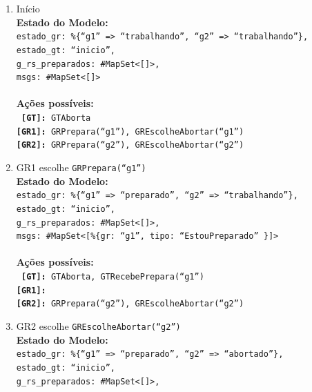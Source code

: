 \begin{enumerate}
\item Início\\
  \textbf{Estado do Modelo:} \texttt{\small \\
    estado\_gr:\ \%\{``g1'' =\textgreater{} ``trabalhando'', ``g2'' =\textgreater{}
    ``trabalhando''\},\\
    estado\_gt:\ ``inicio'',\\
    g\_rs\_preparados:\ \#MapSet\textless{}[]\textgreater{},\\
    msgs:\ \#MapSet\textless{}[]\textgreater{}\\\\}
  \textbf{Ações possíveis:}\\\texttt{
    \textbf{[GT]:}\ GTAborta\\
    \textbf{[GR1]:}\ GRPrepara(``g1''), GREscolheAbortar(``g1'')\\
    \textbf{[GR2]:}\ GRPrepara(``g2''), GREscolheAbortar(``g2'')\\}
\item GR1 escolhe \texttt{GRPrepara(``g1'')}\\
  \textbf{Estado do Modelo:} \texttt{\small \\
    estado\_gr:\ \%\{``g1'' =\textgreater{} ``preparado'', ``g2'' =\textgreater{}
    ``trabalhando''\},\\
    estado\_gt:\ ``inicio'',\\
    g\_rs\_preparados:\ \#MapSet\textless{}[]\textgreater{},\\
    msgs:\ \#MapSet\textless{}[\%\{gr:\ ``g1'', tipo:\ ``EstouPreparado'' \}]\textgreater{}\\\\}
  \textbf{Ações possíveis:}\\\texttt{
    \textbf{[GT]:}\ GTAborta, GTRecebePrepara(``g1'')\\
    \textbf{[GR1]:}\ \\
    \textbf{[GR2]:}\ GRPrepara(``g2''), GREscolheAbortar(``g2'')\\}
\item GR2 escolhe \texttt{GREscolheAbortar(``g2'')}\\
  \textbf{Estado do Modelo:} \texttt{\small \\
    estado\_gr:\ \%\{``g1'' =\textgreater{} ``preparado'', ``g2'' =\textgreater{}
    ``abortado''\},\\
    estado\_gt:\ ``inicio'',\\
    g\_rs\_preparados:\ \#MapSet\textless{}[]\textgreater{},\\
}
\end{enumerate}
